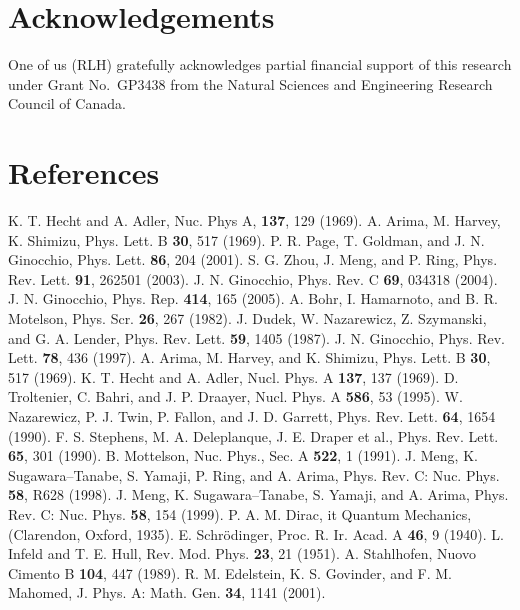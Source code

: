 \documentclass[amsmath,amssymb,superscriptaddress,showkeys, showpacs, aps, nofootinbib]{revtex4}
\begin{document}
\section{Acknowledgements}
One of us (RLH) gratefully acknowledges partial financial support
of this research under Grant No.\ GP3438 from the Natural Sciences
and Engineering Research Council of Canada.\medskip

\section*{References}
\begin{thebibliography}{99}
 K. T. Hecht and A. Adler, Nuc. Phys A, {\bf 137}, 129 (1969).
 A. Arima, M. Harvey, K. Shimizu, Phys. Lett. B {\bf 30}, 517 (1969).
 P. R. Page, T. Goldman, and J. N. Ginocchio, Phys. Lett. {\bf 86}, 204 (2001).
 S. G. Zhou, J. Meng, and P. Ring, Phys. Rev. Lett. {\bf 91}, 262501 (2003).
 J. N. Ginocchio, Phys. Rev. C {\bf 69}, 034318 (2004).
 J. N. Ginocchio, Phys. Rep. {\bf 414}, 165 (2005).
 A. Bohr, I. Hamarnoto, and B. R. Motelson, Phys. Scr. {\bf 26}, 267 (1982).
 J. Dudek, W. Nazarewicz, Z. Szymanski, and G. A. Lender, Phys. Rev. Lett. {\bf 59}, 1405 (1987).
 J. N. Ginocchio, Phys. Rev. Lett. {\bf 78}, 436 (1997).
 A. Arima, M. Harvey, and K. Shimizu, Phys. Lett. B {\bf 30}, 517 (1969).
 K. T. Hecht and A. Adler, Nucl. Phys. A {\bf 137}, 137 (1969).
 D. Troltenier, C. Bahri, and J. P. Draayer, Nucl. Phys. A {\bf 586}, 53 (1995).
 W. Nazarewicz, P. J. Twin, P. Fallon, and J. D. Garrett, Phys. Rev. Lett. {\bf 64}, 1654 (1990).
 F. S. Stephens, M. A. Deleplanque, J. E. Draper et al., Phys. Rev. Lett. {\bf 65}, 301 (1990). 
 B. Mottelson, Nuc. Phys., Sec. A {\bf 522}, 1 (1991).
 J. Meng, K. Sugawara--Tanabe, S. Yamaji, P. Ring, and A. Arima, Phys. Rev. C: Nuc. Phys. {\bf 58}, R628 (1998).
 J. Meng, K. Sugawara--Tanabe, S. Yamaji, and A. Arima, Phys. Rev. C: Nuc. Phys. {\bf 58}, 154 (1999).
 P. A. M. Dirac, {it Quantum Mechanics}, (Clarendon, Oxford, 1935). 
 E. Schr\"{o}dinger, Proc. R. Ir. Acad. A {\bf 46}, 9 (1940). 
 L. Infeld and T. E. Hull, Rev. Mod. Phys. {\bf 23}, 21 (1951).
 A. Stahlhofen, Nuovo Cimento B {\bf 104}, 447 (1989).
 R. M. Edelstein, K. S. Govinder, and F. M. Mahomed, J. Phys. A: Math. Gen. {\bf 34}, 1141 (2001).

\end{thebibliography}
\end{document}

